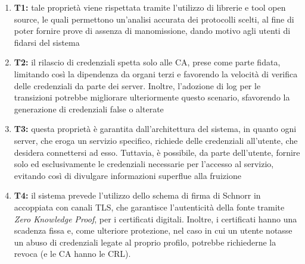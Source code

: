         \begin{enumerate}
            \item \textbf{T1:} tale proprietà viene rispettata tramite l'utilizzo di librerie e tool open source, le quali permettono un'analisi accurata dei protocolli scelti, al fine di poter fornire prove di assenza di manomissione, dando motivo agli utenti di fidarsi del sistema

            \item \textbf{T2:} il rilascio di credenziali spetta solo alle CA, prese come parte fidata, limitando così la dipendenza da organi terzi e favorendo la velocità di verifica delle credenziali da parte dei server.
            Inoltre, l'adozione di log per le transizioni potrebbe migliorare ulteriormente questo scenario, sfavorendo la generazione di credenziali false o alterate

            \item \textbf{T3:} questa proprietà è garantita dall'architettura del sistema, in quanto ogni server, che eroga un servizio specifico, richiede delle credenziali all'utente, che desidera connettersi ad esso.
            Tuttavia, è possibile, da parte dell'utente, fornire solo ed esclusivamente le credenziali necessarie per l'accesso al servizio, evitando così di divulgare informazioni superflue alla fruizione

            \item \textbf{T4:} il sistema prevede l'utilizzo dello schema di firma di Schnorr in accoppiata con canali TLS, che garantisce l'autenticità della fonte tramite \textit{Zero Knowledge Proof}, per i certificati digitali.
            Inoltre, i certificati hanno una scadenza fissa e, come ulteriore protezione, nel caso in cui un utente notasse un abuso di credenziali legate al proprio profilo, potrebbe richiederne la revoca (e le CA hanno le CRL).
            
        \end{enumerate}

